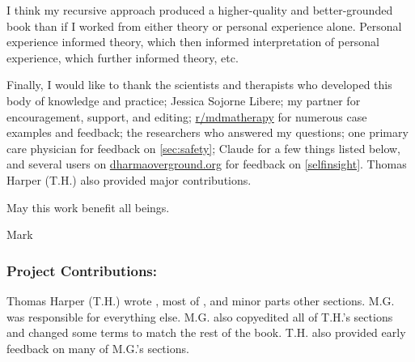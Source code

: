\documentclass[11pt,oneside]{book}
\begin{document}
I think my recursive approach produced a higher-quality and better-grounded book than if I worked from either theory or personal experience alone. Personal experience informed theory, which then informed interpretation of personal experience, which further informed theory, etc.

Finally, I would like to thank the scientists and therapists who developed this body of knowledge and practice; Jessica Sojorne Libere; my partner for encouragement, support, and editing; \href{https://www.reddit.com/r/mdmatherapy}{r/mdmatherapy} for numerous case examples and feedback; the researchers who answered my questions; one primary care physician for feedback on \cref{sec:safety}; Claude for a few things listed below, and several users on \href{www.dharmaoverground.org}{dharmaoverground.org} for feedback on \cref{selfinsight}. Thomas Harper (T.H.) also provided major contributions.

May this work benefit all beings.

Mark

\subsubsection*{Project Contributions:} Thomas Harper (T.H.) wrote , most of , and minor parts other sections. M.G. was responsible for everything else. M.G. also copyedited all of T.H.'s sections and changed some terms to match the rest of the book. T.H. also provided early feedback on many of M.G.'s sections.
\end{document}
